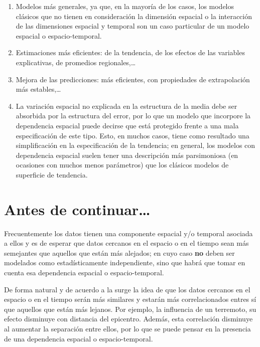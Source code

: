 \documentclass[
]{book}
\theoremstyle{definition}
\theoremstyle{definition}
\theoremstyle{definition}
\theoremstyle{definition}
\theoremstyle{remark}
\begin{document}
\begin{enumerate}
\def\labelenumi{\arabic{enumi}.}
\item
  Modelos más generales, ya que, en la mayoría de los casos, los modelos
  clásicos que no tienen en consideración la dimensión espacial o la
  interacción de las dimensiones espacial y temporal son un caso particular de
  un modelo espacial o espacio-temporal.
\item
  Estimaciones más eficientes: de la tendencia, de los efectos de las
  variables explicativas, de promedios regionales,\ldots{}
\item
  Mejora de las predicciones: más eficientes, con propiedades de extrapolación
  más estables,\ldots{}
\item
  La variación espacial no explicada en la estructura de la media debe ser
  absorbida por la estructura del error, por lo que un modelo que incorpore la
  dependencia espacial puede decirse que está protegido frente a una mala
  especificación de este tipo. Esto, en muchos casos, tiene como resultado una
  simplificación en la especificación de la tendencia; en general, los modelos
  con dependencia espacial suelen tener una descripción más parsimoniosa (en
  ocasiones con muchos menos parámetros) que los clásicos modelos de
  superficie de tendencia.
\end{enumerate}

\hypertarget{antes-de-continuar}{%
\section{\texorpdfstring{Antes de continuar\ldots{} }{Antes de continuar\ldots{} }}\label{antes-de-continuar}}

Frecuentemente los datos tienen una componente espacial y/o temporal asociada a
ellos y es de esperar que datos cercanos en el espacio o en el tiempo sean más
semejantes que aquellos que están más alejados; en cuyo caso \textbf{no} deben ser
modelados como estadísticamente independiente, sino que habrá que tomar en
cuenta esa dependencia espacial o espacio-temporal.

De forma natural y de acuerdo a la  \citep{tobler1970} surge la idea de que
los datos cercanos en el espacio o en el tiempo serán más similares y estarán
más correlacionados entres sí que aquellos que están más lejanos. Por ejemplo,
la influencia de un terremoto, su efecto disminuye con distancia del epicentro.
Además, esta correlación disminuye al aumentar la separación entre ellos, por lo
que se puede pensar en la presencia de una dependencia espacial o
espacio-temporal.
\end{document}
